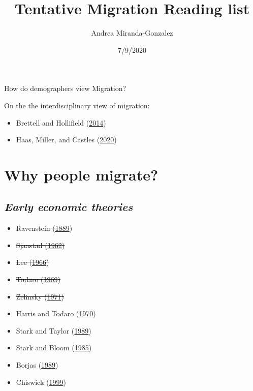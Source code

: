 \documentclass[
]{article}
\title{Tentative Migration Reading list}
\author{Andrea Miranda-Gonzalez}
\date{7/9/2020}
\providecommand{\tightlist}{%
  \setlength{\itemsep}{0pt}\setlength{\parskip}{0pt}}
\begin{document}
\maketitle

{
\hypersetup{linkcolor=}
\setcounter{tocdepth}{2}
\tableofcontents
}
How do demographers view Migration?

On the the interdisciplinary view of migration:

\begin{itemize}
\tightlist
\item
  Brettell and Hollifield
  (\protect\hyperlink{ref-brettell2014migration}{2014})
\item
  Haas, Miller, and Castles (\protect\hyperlink{ref-de2020age}{2020})
\end{itemize}

\hypertarget{why-people-migrate}{%
\section{\texorpdfstring{\textbf{Why people
migrate?}}{Why people migrate?}}\label{why-people-migrate}}

\hypertarget{early-economic-theories}{%
\subsection{\texorpdfstring{\emph{Early economic
theories}}{Early economic theories}}\label{early-economic-theories}}

\begin{itemize}
\tightlist
\item
  \sout{Ravenstein (\protect\hyperlink{ref-ravenstein1889laws}{1889})}
\item
  \sout{Sjaastad (\protect\hyperlink{ref-sjaastad1962costs}{1962})}
\item
  \sout{Lee (\protect\hyperlink{ref-lee1966theory}{1966})}
\item
  \sout{Todaro (\protect\hyperlink{ref-todaro1969model}{1969})}
\item
  \sout{Zelinsky (\protect\hyperlink{ref-zelinsky1971hypothesis}{1971})}
\item
  Harris and Todaro (\protect\hyperlink{ref-harris1970migration}{1970})
\item
  Stark and Taylor (\protect\hyperlink{ref-stark1989relative}{1989})
\item
  Stark and Bloom (\protect\hyperlink{ref-stark1985new}{1985})
\item
  Borjas (\protect\hyperlink{ref-borjas1989economic}{1989})
\item
  Chiswick (\protect\hyperlink{ref-chiswick1999immigrants}{1999})
\end{itemize}
\end{document}
